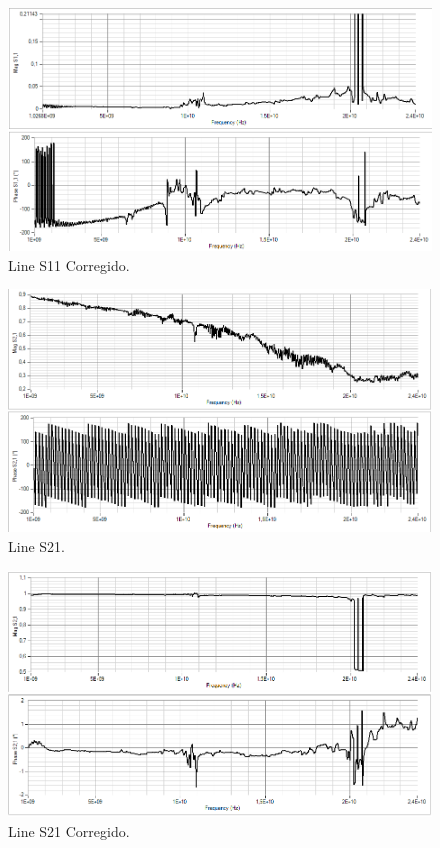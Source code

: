 \documentclass[10pt, a4paper, twocolumn]{article}
\begin{document}
\begin{figure}[hbt!]
	\includegraphics[width=\linewidth]{Fotos/Mediciones/L1_S11_Si.PNG}
	\caption{Line S11 Corregido.}
\end{figure}

\begin{figure}[hbt!]
	\includegraphics[width=\linewidth]{Fotos/Mediciones/L1_S21_No.PNG}
	\caption{Line S21.}
\end{figure}

\begin{figure}[hbt!]
	\includegraphics[width=\linewidth]{Fotos/Mediciones/L1_S21_Si.PNG}
	\caption{Line S21 Corregido.}
\end{figure}
\end{document}
